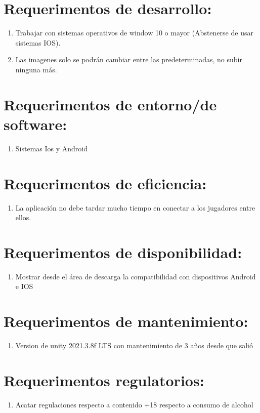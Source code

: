 \documentclass[12pt, oneside, letterpaper]{book}
\begin{document}
\section{Requerimentos de desarrollo: }
\begin{enumerate}
\item Trabajar con sistemas operativos de window 10 o mayor (Abstenerse de usar sistemas IOS). 
\item Las imagenes solo se podrán cambiar entre las predeterminadas, no subir ninguna más.
\end{enumerate}

\section{Requerimentos de entorno/de software: }
\begin{enumerate}
\item Sistemas Ios y Android

\end{enumerate}

\section{Requerimentos de eficiencia: }
\begin{enumerate}
\item La aplicación no debe tardar mucho tiempo en conectar a los jugadores entre ellos.
\end{enumerate}

\section{Requerimentos de disponibilidad: }
\begin{enumerate}
\item Mostrar desde el área de descarga la compatibilidad con dispositivos Android e IOS
\end{enumerate}

\section{Requerimentos de mantenimiento: }
\begin{enumerate}
\item Version de unity 2021.3.8f LTS con mantenimiento de 3 años desde que salió 
\end{enumerate}

\section{Requerimentos regulatorios: }
\begin{enumerate}
\item Acatar regulaciones respecto a contenido +18 respecto a consumo de alcohol 
\end{enumerate}
\end{document}
